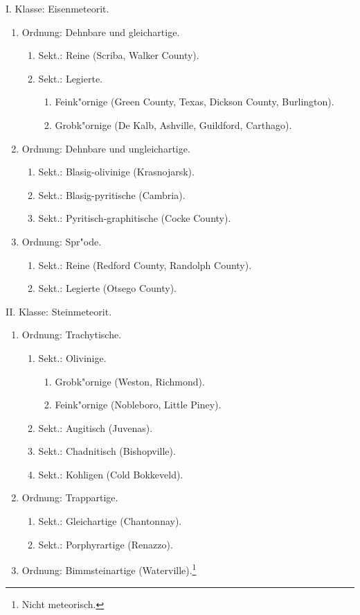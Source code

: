\documentclass[a4paper, 11pt, oneside]{article}
\begin{document}
\begin{center}
I. Klasse: Eisenmeteorit.
\end{center}
\begin{enumerate}
  \item Ordnung: Dehnbare und gleichartige.
  \begin{enumerate}
    \item Sekt.: Reine (Scriba, Walker County).
    \item Sekt.: Legierte.
    \begin{enumerate}
      \item Feink"ornige (Green County, Texas, Dickson County, Burlington).
      \item Grobk"ornige (De Kalb, Ashville, Guildford, Carthago).
    \end{enumerate}
  \end{enumerate}
  \item Ordnung: Dehnbare und ungleichartige.
  \begin{enumerate}
    \item Sekt.: Blasig-olivinige (Krasnojarsk).
    \item Sekt.: Blasig-pyritische (Cambria).
    \item Sekt.: Pyritisch-graphitische (Cocke County).
  \end{enumerate}
  \item Ordnung: Spr"ode.
  \begin{enumerate}
    \item Sekt.: Reine (Redford County, Randolph County).
    \item Sekt.: Legierte (Otsego County).
  \end{enumerate}
\end{enumerate}

\begin{center}
II. Klasse: Steinmeteorit.
\end{center}
\begin{enumerate}
  \item Ordnung: Trachytische.
  \begin{enumerate}
    \item Sekt.: Olivinige.
    \begin{enumerate}
      \item Grobk"ornige (Weston, Richmond).
      \item Feink"ornige (Nobleboro, Little Piney).
    \end{enumerate}
    \item Sekt.: Augitisch (Juvenas).
    \item Sekt.: Chadnitisch (Bishopville).
    \item Sekt.: Kohligen (Cold Bokkeveld).
  \end{enumerate}
  \item Ordnung: Trappartige.
  \begin{enumerate}
    \item Sekt.: Gleichartige (Chantonnay).
    \item Sekt.: Porphyrartige (Renazzo).
  \end{enumerate}
  \item Ordnung: Bimmsteinartige (Waterville).\footnote{Nicht meteorisch.}
\end{enumerate}
\end{document}
